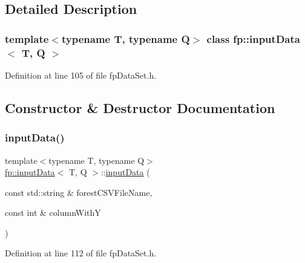 \subsection{Detailed Description}
\subsubsection*{template$<$typename T, typename Q$>$\newline
class fp\+::input\+Data$<$ T, Q $>$}



Definition at line 105 of file fp\+Data\+Set.\+h.



\subsection{Constructor \& Destructor Documentation}
\mbox{\label{classfp_1_1inputData_a1d1a4a8abfd9b4ef7f85cb48a0a017e4}} 
\subsubsection{\texorpdfstring{input\+Data()}{inputData()}}
{\footnotesize\ttfamily template$<$typename T, typename Q$>$ \\
\hyperlink{classfp_1_1inputData}{fp\+::input\+Data}$<$ T, Q $>$\+::\hyperlink{classfp_1_1inputData}{input\+Data} (\begin{DoxyParamCaption}\item[{const std\+::string \&}]{forest\+C\+S\+V\+File\+Name,  }\item[{const int \&}]{column\+WithY }\end{DoxyParamCaption})\hspace{0.3cm}{\ttfamily [inline]}}



Definition at line 112 of file fp\+Data\+Set.\+h.


